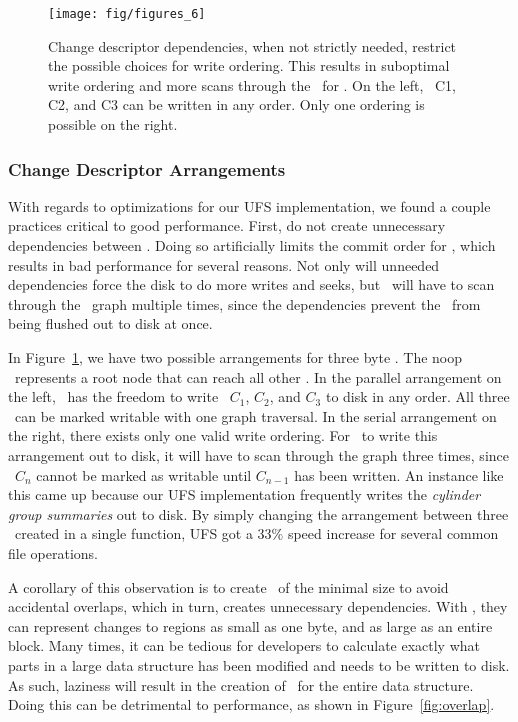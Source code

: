 \begin{figure}[htb]
  \centering
  \texttt{[image: fig/figures\_6]}
  \caption{\label{fig:chdescarrange} Change descriptor dependencies, when
  not strictly needed, restrict the possible choices for write ordering.
  This results in suboptimal write ordering and more scans through the
  \chdescs\ for \Kudos. On the left, \chdescs\ C1, C2, and C3 can be written
  in any order. Only one ordering is possible on the right.}
\end{figure}

\subsubsection {Change Descriptor Arrangements}
With regards to optimizations for our UFS implementation, we found a couple
practices critical to good performance. First, do not create unnecessary
dependencies between \chdescs. Doing so artificially limits the commit order
for \chdescs, which results in bad performance for several reasons. Not only
will unneeded dependencies force the disk to do more writes and seeks, but
\Kudos\ will have to scan through the \chdesc\ graph multiple times, since the
dependencies prevent the \chdescs\ from being flushed out to disk at once.

In Figure~\ref{fig:chdescarrange}, we have two possible arrangements for three
byte \chdescs. The noop \chdesc\ represents a root node that can reach all
other \chdescs. In the parallel arrangement on the left, \Kudos\ has the
freedom to write \chdescs\ $C_1$, $C_2$, and $C_3$ to disk in any order. All
three \chdescs\ can be marked writable with one graph traversal. In the serial
arrangement on the right, there exists only one valid write ordering. For
\Kudos\ to write this arrangement out to disk, it will have to scan through
the graph three times, since \chdesc\ $C_n$ cannot be marked as writable until
$C_{n-1}$ has been written.
An instance like this came up because our UFS implementation frequently writes
the \emph{cylinder group summaries} out to disk. By simply changing the
arrangement between three \chdescs\ created in a single function, UFS got a
33\% speed increase for several common file operations.

A corollary of this observation is to create \chdescs\ of the minimal size
to avoid accidental overlaps, which in turn, creates unnecessary dependencies.
With \chdescs, they can represent changes to regions as small as one byte, and
as large as an entire block. Many times, it can be tedious for developers
to calculate exactly what parts in a large data structure has been modified and
needs to be written to disk. As such, laziness will result in the creation of
\chdescs\ for the entire data structure. Doing this can be detrimental to
performance, as shown in Figure~\ref{fig:overlap}.

